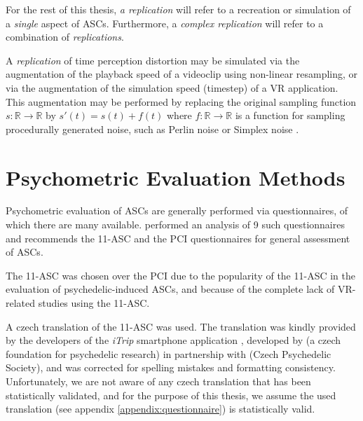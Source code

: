 For the rest of this thesis, \textit{a replication} will refer to a recreation or simulation of a \textit{single} aspect of \acp{ASC}. Furthermore, a \textit{complex replication} will refer to a combination of \textit{replications}.

A \textit{replication} of time perception distortion may be simulated via the augmentation of the playback speed of a videoclip using non-linear resampling, or via the augmentation of the simulation speed (timestep) of a \ac{VR} application. This augmentation may be performed by replacing the original sampling function $s \colon \mathbb{R} \to \mathbb{R}$ by $s'(t) = s(t) + f(t)$ where $f \colon \mathbb{R} \to \mathbb{R}$ is a function for sampling procedurally generated noise, such as Perlin noise \autocite{perlin1985image} or Simplex noise \autocite{olano2002simplex}.

\section{Psychometric Evaluation Methods}
Psychometric evaluation of \acp{ASC} are generally performed via questionnaires, of which there are many available.
\textcites{schmidt2018empirische}{figueiredobuilding} performed an analysis of 9 such questionnaires and recommends the \acf{11-ASC} and the \ac{PCI} questionnaires for general assessment of \acp{ASC}.

The \ac{11-ASC} was chosen over the \ac{PCI} due to the popularity of the \ac{11-ASC} in the evaluation of psychedelic-induced \acp{ASC}, and because of the complete lack of \ac{VR}-related studies using the \ac{11-ASC}.

A czech translation of the \ac{11-ASC} was used. The translation was kindly provided by the developers of the \textit{iTrip} smartphone application \autocite{nimh2020itrip}, developed by  (a czech foundation for psychedelic research) in partnership with  (Czech Psychedelic Society), and was corrected for spelling mistakes and formatting consistency. Unfortunately, we are not aware of any czech translation that has been statistically validated, and for the purpose of this thesis, we assume the used translation (see appendix \ref{appendix:questionnaire}) is statistically valid.
